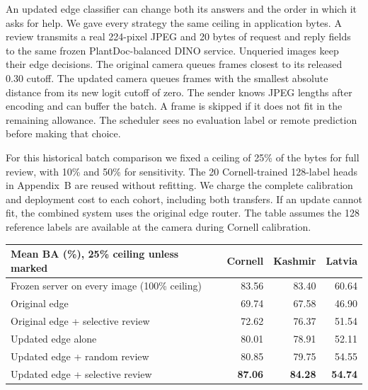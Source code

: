 \newpage
{}
An updated edge classifier can change both its answers and the order in which it asks for help. We gave every strategy the same ceiling in application bytes. A review transmits a real 224-pixel JPEG and 20 bytes of request and reply fields to the same frozen PlantDoc-balanced DINO service. Unqueried images keep their edge decisions. The original camera queues frames closest to its released 0.30 cutoff. The updated camera queues frames with the smallest absolute distance from its new logit cutoff of zero. The sender knows JPEG lengths after encoding and can buffer the batch. A frame is skipped if it does not fit in the remaining allowance. The scheduler sees no evaluation label or remote prediction before making that choice.

For this historical batch comparison we fixed a ceiling of 25\% of the bytes for full review, with 10\% and 50\% for sensitivity. The 20 Cornell-trained 128-label heads in Appendix~B are reused without refitting. We charge the complete calibration and deployment cost to each cohort, including both transfers. If an update cannot fit, the combined system uses the original edge router. The table assumes the 128 reference labels are available at the camera during Cornell calibration.

\begin{center}\small
\begin{tabular}{@{}lrrr@{}}\toprule
Mean BA (\%), 25\% ceiling unless marked & Cornell & Kashmir & Latvia\\\midrule
Frozen server on every image (100\% ceiling) &83.56&83.40&60.64\\
Original edge &69.74&67.58&46.90\\
Original edge + selective review &72.62&76.37&51.54\\
Updated edge alone &80.01&78.91&52.11\\
Updated edge + random review &80.85&79.75&54.55\\
Updated edge + selective review &\textbf{87.06}&\textbf{84.28}&\textbf{54.74}\\\bottomrule
\end{tabular}\end{center}

